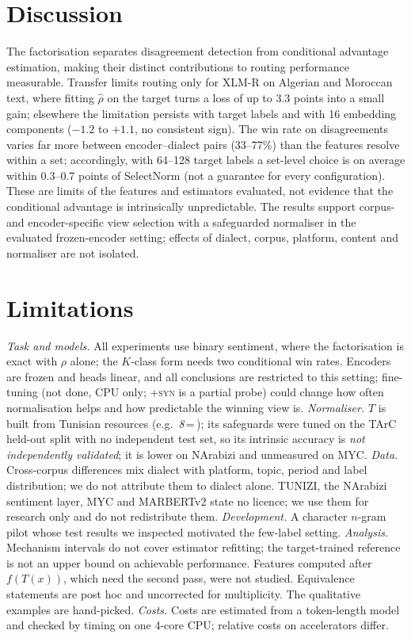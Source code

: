 \section{Discussion}
\label{sec:discussion}

The factorisation separates disagreement detection from conditional advantage estimation, making their distinct contributions to routing performance measurable. Transfer limits routing only for XLM-R on Algerian and Moroccan text, where fitting $\hat\rho$ on the target turns a loss of up to 3.3 points into a small gain; elsewhere the limitation persists with target labels and with 16 embedding components ($-1.2$ to $+1.1$, no consistent sign). The win rate on disagreements varies far more between encoder--dialect pairs (33--77\%) than the features resolve within a set; accordingly, with 64--128 target labels a set-level choice is on average within 0.3--0.7 points of SelectNorm (not a guarantee for every configuration). These are limits of the features and estimators evaluated, not evidence that the conditional advantage is intrinsically unpredictable. The results support corpus- and encoder-specific view selection with a safeguarded normaliser in the evaluated frozen-encoder setting; effects of dialect, corpus, platform, content and normaliser are not isolated.

\section{Limitations}
\label{sec:limitations}
\emph{Task and models.} All experiments use binary sentiment, where the factorisation is exact with $\rho$ alone; the $K$-class form needs two conditional win rates. Encoders are frozen and heads linear, and all conclusions are restricted to this setting; fine-tuning (not done, CPU only; \textsc{+syn} is a partial probe) could change how often normalisation helps and how predictable the winning view is.
\emph{Normaliser.} $T$ is built from Tunisian resources (e.g.\ \textit{8}\,=\,); its safeguards were tuned on the TArC held-out split with no independent test set, so its intrinsic accuracy is \emph{not independently validated}; it is lower on NArabizi and unmeasured on MYC.
\emph{Data.} Cross-corpus differences mix dialect with platform, topic, period and label distribution; we do not attribute them to dialect alone. TUNIZI, the NArabizi sentiment layer, MYC and MARBERTv2 state no licence; we use them for research only and do not redistribute them.
\emph{Development.} A character $n$-gram pilot whose test results we inspected motivated the few-label setting.
\emph{Analysis.} Mechanism intervals do not cover estimator refitting; the target-trained reference is not an upper bound on achievable performance. Features computed after $f(T(x))$, which need the second pass, were not studied. Equivalence statements are post hoc and uncorrected for multiplicity. The qualitative examples are hand-picked.
\emph{Costs.} Costs are estimated from a token-length model and checked by timing on one 4-core CPU; relative costs on accelerators differ.
